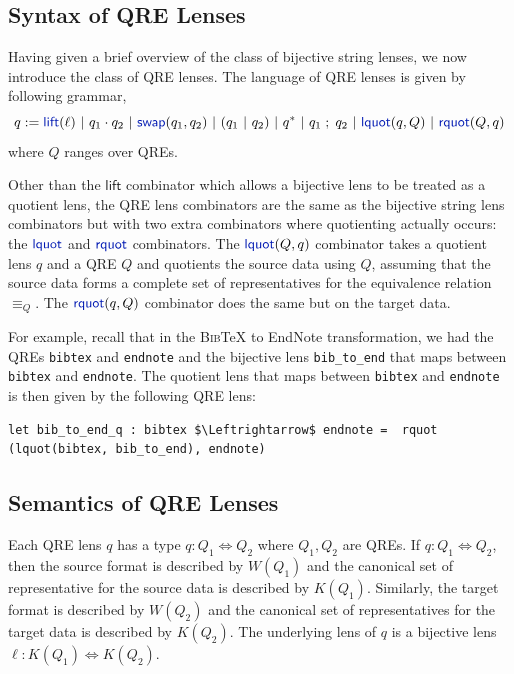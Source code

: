 \documentclass[acmsmall,screen]{acmart}
\newcommand{\kw}[1]{\textcolor{dkblue}{\ensuremath{\mathsf{#1}}}}
\newcommand{\eqrel}[1]{\ensuremath{\equiv_{#1}}}
\newcommand{\sep}{\ensuremath{\ | \ }}
\newcommand{\bibtex}{\textsc{Bib}\TeX{}}
\newcommand{\swap}{\ensuremath{\kw{swap}}}
\newcommand{\lquot}{\ensuremath{\kw{lquot}}}
\newcommand{\rquot}{\ensuremath{\kw{rquot}}}
\newcommand{\lift}{\ensuremath{\kw{lift}}}
\newcommand{\cd}[1]{\lstinline[backgroundcolor=\color{white}]$#1$}
\begin{document}
\subsection{Syntax of QRE Lenses}
\label{subsec:qre-lenses-syntax}
Having given a brief overview of the class of bijective string lenses, we now
introduce the class of QRE lenses. The language of QRE lenses is given by
following grammar,
$$ q := \lift(\ell) \sep  q_1 \cdot q_2 \sep \swap(q_1, q_2) \sep (q_1 \sep q_2)
\sep q^* \sep q_1 \; ; \; q_2 \sep \lquot(q, Q) \sep \rquot(Q, q)$$
where $Q$ ranges over QREs.

Other than the \kw{lift} combinator which allows a bijective lens to be
treated as a quotient lens, the QRE lens combinators are the same as the
bijective string lens combinators but with two extra combinators where
quotienting actually occurs: the $\lquot$ and $\rquot$ combinators. The
$\lquot(Q, q)$ combinator takes a quotient lens $q$ and a QRE $Q$ and quotients the source
data using $Q$, assuming that the source data forms a complete set of
representatives for the equivalence relation $\eqrel{Q}$. The $\rquot(q, Q)$
combinator does the same but on the target data.

For example, recall that in the \bibtex{} to EndNote transformation, we had the
QREs \cd{bibtex} and \cd{endnote} and the bijective lens \cd{bib_to_end}
that maps between 
\cd{bibtex} and \cd{endnote}. The quotient lens that maps between
\cd{bibtex} and \cd{endnote} is then given by the following QRE lens:

\begin{lstlisting}
let bib_to_end_q : bibtex $\Leftrightarrow$ endnote =  rquot (lquot(bibtex, bib_to_end), endnote)
\end{lstlisting}

\subsection{Semantics of QRE Lenses}
\label{subsec:qre-lenses-semantics}
Each QRE lens $q$ has a type $q : Q_1 \Leftrightarrow Q_2$ where $Q_1, Q_2$ are
QREs. If $q : Q_1 \Leftrightarrow Q_2$, then the source format is described by
$W(Q_1)$ and the canonical set of representative for the source data is
described by $K(Q_1)$.
Similarly, the target format is described by $W(Q_2)$ and the canonical set of
representatives for the target data is described by $K(Q_2)$. The underlying
lens of $q$ is a bijective lens $\ell : K(Q_1) \Leftrightarrow K(Q_2)$.
\end{document}
